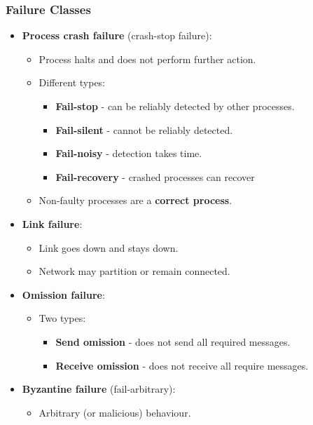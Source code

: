 \documentclass[11pt]{article}
\begin{document}
\subsubsection{Failure Classes}
\begin{itemize}
  \item \textbf{Process crash failure} (crash-stop failure):
    \begin{itemize}
      \item Process halts and does not perform further action.
      \item Different types:
        \begin{itemize}
          \item \textbf{Fail-stop} - can be reliably detected by other processes.
          \item \textbf{Fail-silent} - cannot be reliably detected.
          \item \textbf{Fail-noisy} - detection takes time.
          \item \textbf{Fail-recovery} - crashed processes can recover
        \end{itemize}
      \item Non-faulty processes are a \textbf{correct process}.
    \end{itemize}
  \item \textbf{Link failure}:
    \begin{itemize}
      \item Link goes down and stays down.
      \item Network may partition or remain connected.
    \end{itemize}
  \item \textbf{Omission failure}:
    \begin{itemize}
      \item Two types:
        \begin{itemize}
          \item \textbf{Send omission} - does not send all required messages.
          \item \textbf{Receive omission} - does not receive all require messages.
        \end{itemize}
    \end{itemize}
  \item \textbf{Byzantine failure} (fail-arbitrary):
    \begin{itemize}
      \item Arbitrary (or malicious) behaviour.
    \end{itemize}
\end{itemize}
\end{document}
